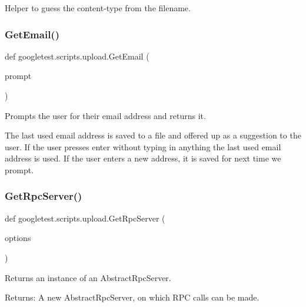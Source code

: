 \begin{DoxyVerb}Helper to guess the content-type from the filename.\end{DoxyVerb}
 \mbox{\label{namespacegoogletest_1_1scripts_1_1upload_a44f3e1b668cef3e193bc281562d1f46e}} 
\subsubsection{\texorpdfstring{GetEmail()}{GetEmail()}}
{\footnotesize\ttfamily def googletest.\+scripts.\+upload.\+Get\+Email (\begin{DoxyParamCaption}\item[{}]{prompt }\end{DoxyParamCaption})}

\begin{DoxyVerb}Prompts the user for their email address and returns it.

The last used email address is saved to a file and offered up as a suggestion
to the user. If the user presses enter without typing in anything the last
used email address is used. If the user enters a new address, it is saved
for next time we prompt.\end{DoxyVerb}
 \mbox{\label{namespacegoogletest_1_1scripts_1_1upload_a0f71ac3e4c2082d3cbd0110bb609d435}} 
\subsubsection{\texorpdfstring{GetRpcServer()}{GetRpcServer()}}
{\footnotesize\ttfamily def googletest.\+scripts.\+upload.\+Get\+Rpc\+Server (\begin{DoxyParamCaption}\item[{}]{options }\end{DoxyParamCaption})}

\begin{DoxyVerb}Returns an instance of an AbstractRpcServer.

Returns:
  A new AbstractRpcServer, on which RPC calls can be made.
\end{DoxyVerb}
 \mbox{\label{namespacegoogletest_1_1scripts_1_1upload_ae47e7ae09d5291bc72beb6603a1180bb}} 
